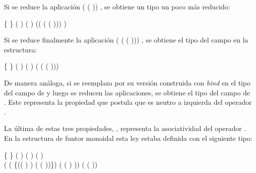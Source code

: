 Si se reduce la aplicación (\AgdaSymbol{$\lambda$}  \AgdaSymbol{$\rightarrow$} ( )) , se obtiene un tipo un poco más reducido:
\begin{center}
\AgdaSymbol{$\forall$} \{ \AgdaSymbol{:} \} \AgdaSymbol{$\rightarrow$} ( \AgdaSymbol{:} ) \AgdaSymbol{$\rightarrow$} ( )  ((\AgdaSymbol{$\lambda$}  \AgdaSymbol{$\rightarrow$}  \AgdaField{$\gg=$} (\AgdaSymbol{$\lambda$}  \AgdaSymbol{$\rightarrow$}  ( ))) )
\end{center}

Si se reduce finalmente la aplicación (\AgdaSymbol{$\lambda$}  \AgdaSymbol{$\rightarrow$}  \AgdaField{$\gg=$} (\AgdaSymbol{$\lambda$}  \AgdaSymbol{$\rightarrow$}  ( ))) , se obtiene el tipo del campo  en la estructura:
\begin{center}
\AgdaSymbol{$\forall$} \{ \AgdaSymbol{:} \} \AgdaSymbol{$\rightarrow$} ( \AgdaSymbol{:} ) \AgdaSymbol{$\rightarrow$} ( )  ( \AgdaField{$\gg=$} (\AgdaSymbol{$\lambda$}  \AgdaSymbol{$\rightarrow$}  ( )))
\end{center}

De manera análoga, si se reemplaza  por su versión construida con \textit{bind} en el tipo del campo  de  y luego se reducen las aplicaciones, se obtiene el tipo del campo  de . Este representa la propiedad que postula que  es neutro a izquierda del operador . 

La última de estas tres propiedades, , representa la asociatividad del operador . En la estructura de funtor monoidal esta ley estaba definida con el siguiente tipo:
\begin{center}
\AgdaSymbol{$\forall$} \{ \AgdaSymbol{:} \} \AgdaSymbol{$\rightarrow$} ( \AgdaSymbol{:} ) ( \AgdaSymbol{:} ) ( \AgdaSymbol{:} ) \AgdaSymbol{$\rightarrow$} \\ ( (\AgdaSymbol{$\lambda$} \{(( \AgdaInductiveConstructor{,} ) \AgdaInductiveConstructor{,} ) \AgdaSymbol{$\rightarrow$} ( \AgdaInductiveConstructor{,} ( \AgdaInductiveConstructor{,} ))\}) ( ( ) ))  (  ( ))
\end{center}

